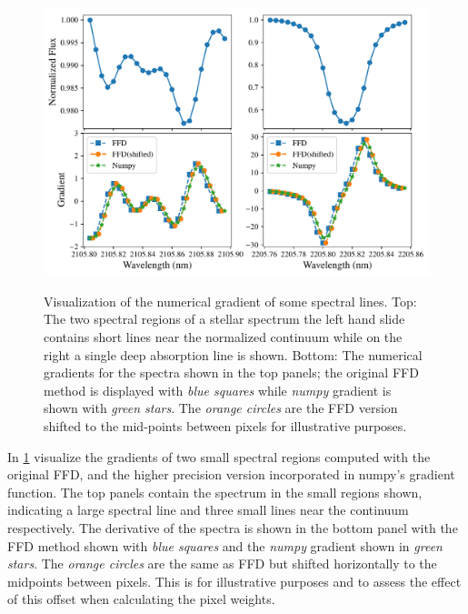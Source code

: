 \begin{figure}
    \centering
    \includegraphics[width=0.8\linewidth]{figures/information-content/spectral_gradients}\\
    \caption[Comparing of numerical gradient alogithms.]{Visualization of the numerical gradient of some spectral lines.
        Top: The two spectral regions of a stellar spectrum the left hand slide contains short lines near the normalized continuum while on the right a single deep absorption line is shown.
        Bottom: The numerical gradients for the spectra shown in the top panels; the original {FFD} method is displayed with \emph{blue squares} while \emph{numpy} gradient is shown with \emph{green stars}.
        The \emph{orange circles} are the {FFD} version shifted to the mid-points between pixels for illustrative purposes.}
    \label{fig:gradients}
\end{figure}




In \cref{fig:gradients}  visualize the gradients of two small spectral regions computed with the original {FFD}, and the higher precision version incorporated in numpy's gradient function.
The top panels contain the spectrum in the small regions shown, indicating a large spectral line and three small lines near the continuum respectively.
The derivative of the spectra is shown in the bottom panel with the {FFD} method shown with \emph{blue squares} and the \emph{numpy} gradient shown in \emph{green stars}.
The \emph{orange circles} are the same as {FFD} but shifted horizontally to the midpoints between pixels.
This is for illustrative purposes and to assess the effect of this offset when calculating the pixel weights.

